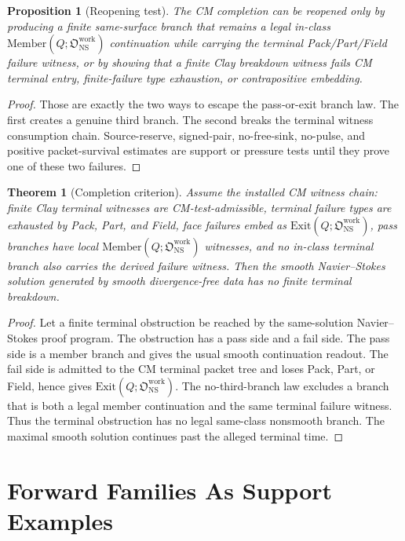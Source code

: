 \documentclass[11pt]{article}
\newtheorem{theorem}{Theorem}
\newtheorem{proposition}{Proposition}
\newcommand{\NS}{\mathrm{NS}}
\newcommand{\Member}{\mathrm{Member}}
\newcommand{\Exit}{\mathrm{Exit}}
\newcommand{\Owork}{\mathfrak O_{\NS}^{\mathrm{work}}}
\begin{document}
\begin{proposition}[Reopening test]
The CM completion can be reopened only by producing a finite same-surface branch that remains a legal in-class \(\Member(Q;\Owork)\) continuation while carrying the terminal Pack/Part/Field failure witness, or by showing that a finite Clay breakdown witness fails CM terminal entry, finite-failure type exhaustion, or contrapositive embedding.
\end{proposition}

\begin{proof}
Those are exactly the two ways to escape the pass-or-exit branch law.
The first creates a genuine third branch.
The second breaks the terminal witness consumption chain.
Source-reserve, signed-pair, no-free-sink, no-pulse, and positive packet-survival estimates are support or pressure tests until they prove one of these two failures.
\end{proof}

\begin{theorem}[Completion criterion]
Assume the installed CM witness chain: finite Clay terminal witnesses are CM-test-admissible, terminal failure types are exhausted by Pack, Part, and Field, face failures embed as \(\Exit(Q;\Owork)\), pass branches have local \(\Member(Q;\Owork)\) witnesses, and no in-class terminal branch also carries the derived failure witness.
Then the smooth Navier--Stokes solution generated by smooth divergence-free data has no finite terminal breakdown.
\end{theorem}

\begin{proof}
Let a finite terminal obstruction be reached by the same-solution Navier--Stokes proof program.
The obstruction has a pass side and a fail side.
The pass side is a member branch and gives the usual smooth continuation readout.
The fail side is admitted to the CM terminal packet tree and loses Pack, Part, or Field, hence gives \(\Exit(Q;\Owork)\).
The no-third-branch law excludes a branch that is both a legal member continuation and the same terminal failure witness.
Thus the terminal obstruction has no legal same-class nonsmooth branch.
The maximal smooth solution continues past the alleged terminal time.
\end{proof}

\section{Forward Families As Support Examples}
\end{document}

